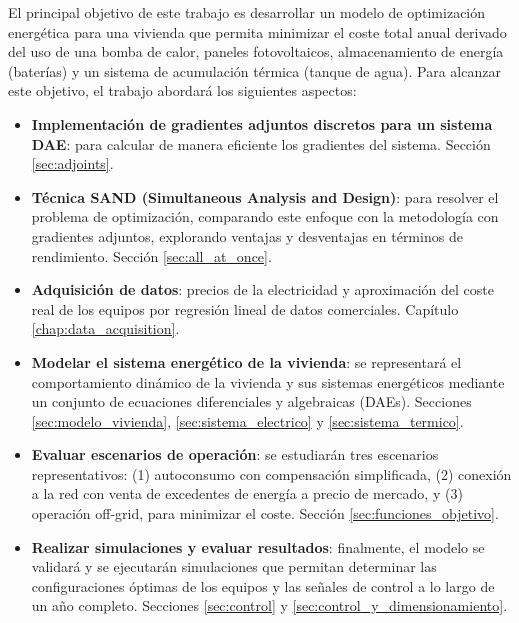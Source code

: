 El principal objetivo de este trabajo es desarrollar un modelo de optimización
energética para una vivienda que permita minimizar el coste total anual
derivado del uso de una bomba de calor, paneles fotovoltaicos, almacenamiento
de energía (baterías) y un sistema de acumulación térmica (tanque de agua).
Para alcanzar este objetivo, el trabajo abordará los siguientes aspectos:

\begin{itemize}
	\item \textbf{Implementación de gradientes adjuntos discretos para un sistema
		      DAE}: para calcular de manera eficiente los gradientes del sistema.
	      Sección \ref{sec:adjoints}.

	\item \textbf{Técnica SAND (Simultaneous Analysis and Design)}: para resolver
	      el problema de optimización, comparando este enfoque con la metodología con
	      gradientes adjuntos, explorando ventajas y desventajas en términos de
	      rendimiento. Sección \ref{sec:all_at_once}.

	\item \textbf{Adquisición de datos}: precios de la electricidad y aproximación
	      del coste real de los equipos por regresión lineal de datos comerciales.
	      Capítulo \ref{chap:data_acquisition}.

	\item \textbf{Modelar el sistema energético de la vivienda}: se representará
	      el comportamiento dinámico de la vivienda y sus sistemas energéticos mediante
	      un conjunto de ecuaciones diferenciales y algebraicas (DAEs). Secciones
	      \ref{sec:modelo_vivienda}, \ref{sec:sistema_electrico} y
	      \ref{sec:sistema_termico}.

	\item \textbf{Evaluar escenarios de operación}: se estudiarán tres escenarios
	      representativos: (1) autoconsumo con compensación simplificada, (2) conexión
	      a la red con venta de excedentes de energía a precio de mercado, y (3)
	      operación off-grid, para minimizar el coste. Sección
	      \ref{sec:funciones_objetivo}.

	\item \textbf{Realizar simulaciones y evaluar resultados}: finalmente, el
	      modelo se validará y se ejecutarán simulaciones que permitan determinar las
	      configuraciones óptimas de los equipos y las señales de control a lo largo de
	      un año completo. Secciones \ref{sec:control} y
	      \ref{sec:control_y_dimensionamiento}.
\end{itemize}
